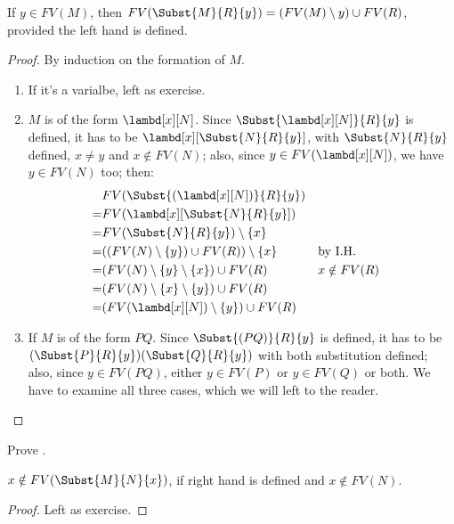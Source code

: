 \documentclass[../../../include/open-logic-section]{subfiles}
\begin{document}
\begin{thm} 
  If $y \in FV(M)$, then $FV(\Subst{M}{R}{y}) = (FV(M) \setminus
  {y}) \cup FV(R)$, provided the left hand is defined.
\end{thm}
\begin{proof}
  By induction on the formation of $M$.
  \begin{enumerate}
  \item If it's a varialbe, left as exercise. 
  \item $M$ is of the form $\lambd[x][N]$. Since
    $\Subst{\lambd[x][N]}{R}{y}$ is defined, it has to be
    $\lambd[x][\Subst{N}{R}{y}]$, with $\Subst{N}{R}{y}$
    defined, $x \neq y$ and $x \notin FV(N)$; also, since $y \in
    FV(\lambd[x][N])$, we have $y \in FV(N)$ too; then:
    \begin{align*}
      &FV(\Subst{(\lambd[x][N])}{R}{y}) \\
      =&FV(\lambd[x][\Subst{N}{R}{y}]) \\
      =&FV(\Subst{N}{R}{y}) \setminus \{x\} \\
      =&((FV(N) \setminus \{y\}) \cup FV(R)) \setminus \{x\}
       && \text{by I.H.} \\
      =&(FV(N) \setminus \{y\} \setminus \{x\}) \cup FV(R)
       && x \notin FV(R) \\
      =&(FV(N) \setminus \{x\} \setminus \{y\}) \cup FV(R) \\
      =& (FV(\lambd[x][N]) \setminus \{y\}) \cup FV(R)
    \end{align*}
  \item If $M$ is of the form $PQ$. Since
    $\Subst{(PQ)}{R}{y}$ is defined, it has to be
    $(\Subst{P}{R}{y})(\Subst{Q}{R}{y})$ with both substitution
    defined; also, since $y \in FV(PQ)$, either $y \in FV(P)$ or
    $y \in FV(Q)$ or both. We have to examine all three cases, which
    we will left to the reader.
  \end{enumerate}
\end{proof}

\begin{prob}
  Prove .
\end{prob}

\begin{thm}
  $x \notin FV(\Subst{M}{N}{x})$, if right hand is
  defined and $x \notin FV(N)$.
\end{thm}
\begin{proof}
  Left as exercise.
\end{proof}
\end{document}
